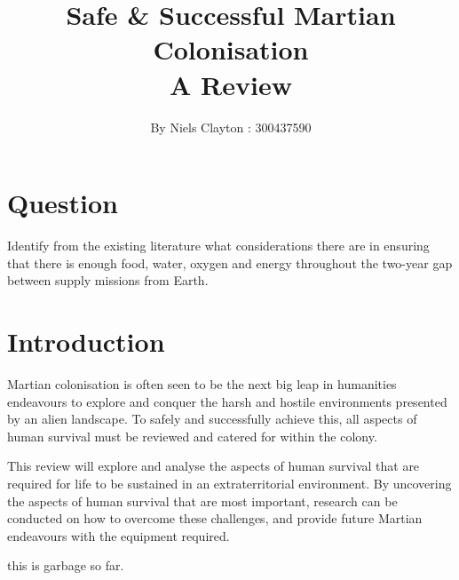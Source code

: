 \documentclass[a4paper,11pt]{article}
\begin{document}
\title{\LARGE{\textbf{Safe \& Successful Martian Colonisation}\\A Review}}
\author{By Niels Clayton : 300437590}
\date{}
\maketitle

\section*{Question}
Identify from the existing literature what considerations there are in ensuring that there is enough food, water, oxygen and energy throughout the two-year gap between supply missions from Earth.

\section*{Introduction}
\linenumbers
Martian colonisation is often seen to be the next big leap in humanities endeavours to explore and conquer the harsh and hostile environments presented by an alien landscape. To safely and successfully achieve this, all aspects of human survival must be reviewed and catered for within the colony.

This review will explore and analyse the aspects of human survival that are required for life to be sustained in an extraterritorial environment. By uncovering the aspects of human survival that are most important, research can be conducted on how to overcome these challenges, and provide future Martian endeavours with the equipment required.

this is garbage so far.
\end{document}
